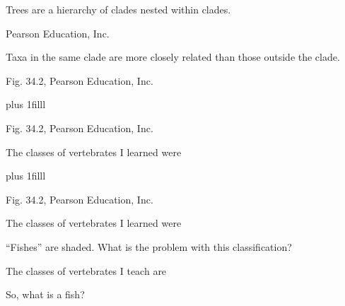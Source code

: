 \documentclass[t]{beamer}
\newcommand{\btVFill}{\vskip0pt plus 1filll}
\begin{document}
{
\begin{frame}[b]{Trees are a hierarchy of clades nested within clades.}

\tiny \textcopyright Pearson Education, Inc.
\end{frame}
}
{
\begin{frame}[b]{Taxa in the same clade are more closely related than those outside the clade.}

\end{frame}
}

%
{
\begin{frame}[b]

	\tiny Fig. 34.2, \textcopyright Pearson Education, Inc.
\end{frame}
}
%
%
{
\begin{frame}[t]{}

	
	\btVFill
	
	\tiny Fig. 34.2, \tiny \textcopyright Pearson Education, Inc.
\end{frame}
}
%
{
\begin{frame}[t]{The classes of vertebrates I learned were}

	\vskip0pt plus 1filll
	
	\tiny Fig. 34.2, \tiny \textcopyright Pearson Education, Inc.
\end{frame}
}
%
{
\begin{frame}[t]{The classes of vertebrates I learned were}

	\vspace*{-0.5\baselineskip}
	
	\hangpara “Fishes” are shaded. What is the problem with this classification?
		
\end{frame}
}
{
\begin{frame}[t]{The classes of vertebrates I teach are}

	\vspace*{-0.5\baselineskip}
	
	\hangpara So, what is a fish? \alt<handout>{}{\pause \highlight{You are!}}
	
\end{frame}
}
\end{document}
